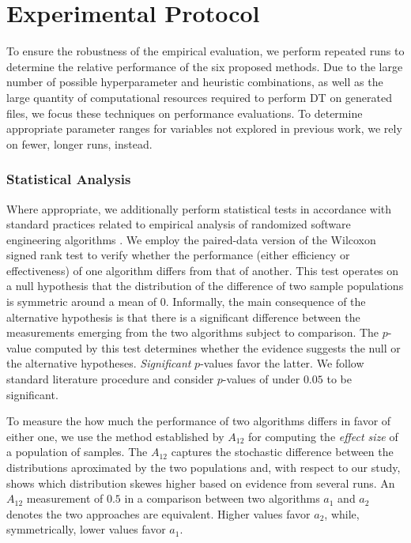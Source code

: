 \section{\label{sec:protocol}Experimental Protocol}

To ensure the robustness of the empirical evaluation, we perform repeated runs
to determine the relative performance of the six proposed methods.
Due to the large number of possible hyperparameter and heuristic
combinations, as well as the large quantity of computational resources
required to perform \gls{DT} on generated files, we focus these
techniques on performance evaluations.
To determine appropriate parameter ranges for variables not explored in previous work,
we rely on fewer, longer runs, instead.

\subsubsection{Statistical Analysis}

Where appropriate, we additionally perform statistical tests in accordance
with standard practices related to empirical analysis of
randomized software engineering algorithms \cite{arcuri2014hitchhiker}.
We employ the paired-data version of the
Wilcoxon \cite{conover1999practical} signed rank test to verify
whether the performance (either efficiency or effectiveness) of one algorithm
differs from that of another.
This test operates on a null hypothesis that the distribution
of the difference of two sample populations is symmetric around a mean of 0.
Informally, the main consequence of the alternative hypothesis is that
there is a significant difference between the measurements emerging from the 
two algorithms subject to comparison.
The $p$-value computed by this test determines whether the evidence
suggests the null or the alternative hypotheses.
\textit{Significant} $p$-values favor the latter.
We follow standard literature procedure and consider $p$-values
of under $0.05$ to be significant.

To measure the how much the performance of two
algorithms differs in favor of either one, we use the method
established by \citet{vargha2000critique} $A_{12}$ for computing the \textit{effect size}
of a population of samples.
The $A_{12}$ captures the stochastic difference between the 
distributions aproximated by the two populations and, with respect
to our study, shows which distribution skewes higher based on evidence from
several runs.
An $A_{12}$ measurement of $0.5$ in a comparison between two 
algorithms $a_1$ and $a_2$ denotes the two approaches
are equivalent.
Higher values favor $a_2$, while, symmetrically, lower values favor $a_1$.

